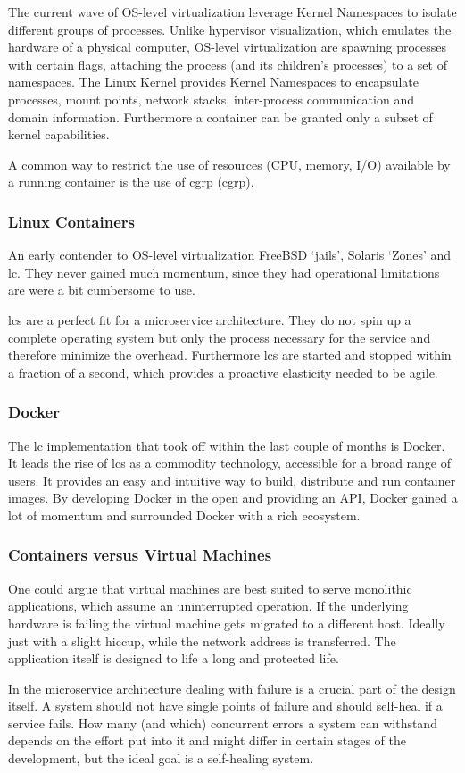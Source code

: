The current wave of OS-level virtualization leverage Kernel Namespaces to isolate different groups of processes. Unlike hypervisor visualization, which emulates
the hardware of a physical computer, OS-level virtualization are spawning processes with certain flags, attaching the process (and its children's processes)
to a set of namespaces. The Linux Kernel provides Kernel Namespaces to encapsulate processes, mount points, network stacks,
inter-process communication and domain information. Furthermore a container can be granted only a subset of kernel capabilities.

A common way to restrict the use of resources (CPU, memory, I/O) available by a running container is the use of \gls{cgrp} (\glsdesc{cgrp}).

\subsubsection{Linux Containers}
An early contender to OS-level virtualization FreeBSD `jails', Solaris `Zones' and \gls{lc}. They never gained much momentum, since they had operational limitations are were a bit cumbersome to use.

\glspl{lc} are a perfect fit for a microservice architecture. They do not spin up a complete operating system but only the process
necessary for the service and therefore minimize the overhead. Furthermore \glspl{lc} are started and stopped within a
fraction of a second, which provides a proactive elasticity needed to be agile.

\subsubsection{Docker}
The \gls{lc} implementation that took off within the last couple of months is Docker. It leads the rise of \glspl{lc} as a commodity technology, accessible
for a broad range of users. It provides an easy and intuitive way to build, distribute and run container images.
By developing Docker in the open and providing an API, Docker gained a lot of momentum and surrounded Docker with a rich ecosystem.

\subsubsection{Containers versus Virtual Machines}
One could argue that virtual machines are best suited to serve monolithic applications,
which assume an uninterrupted operation. If the underlying hardware is failing the virtual machine gets migrated to a different host. Ideally just
with a slight hiccup, while the network address is transferred. The application itself is designed to life a long and protected life.

In the microservice architecture dealing with failure is a crucial part of the design itself. A system should not have single points of failure and
should self-heal if a service fails. How many (and which) concurrent errors a system can withstand depends on the effort put into it and might differ
in certain stages of the development, but the ideal goal is a self-healing system.


